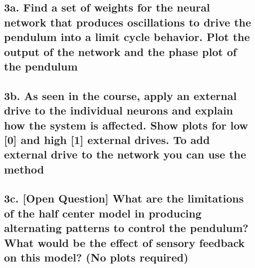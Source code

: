\documentclass{cmc}
\begin{document}
\subsection*{3a. Find a set of weights for the neural network that
  produces oscillations to drive the pendulum into a limit cycle
  behavior. Plot the output of the network and the phase plot of
the pendulum}
\label{sec:4a}


\subsection*{3b. As seen in the course, apply an external drive to the
  individual neurons and explain how the system is affected. Show
  plots for low [0] and high [1] external drives. To add external
  drive to the network you can use the method \\
   }
\label{sec:4c}


\subsection*{3c. [Open Question] What are the limitations of the half
  center model in producing alternating patterns to control the
  pendulum? What would be the effect of sensory feedback on this
  model? (No plots required)}
\label{sec:4d}
\end{document}
